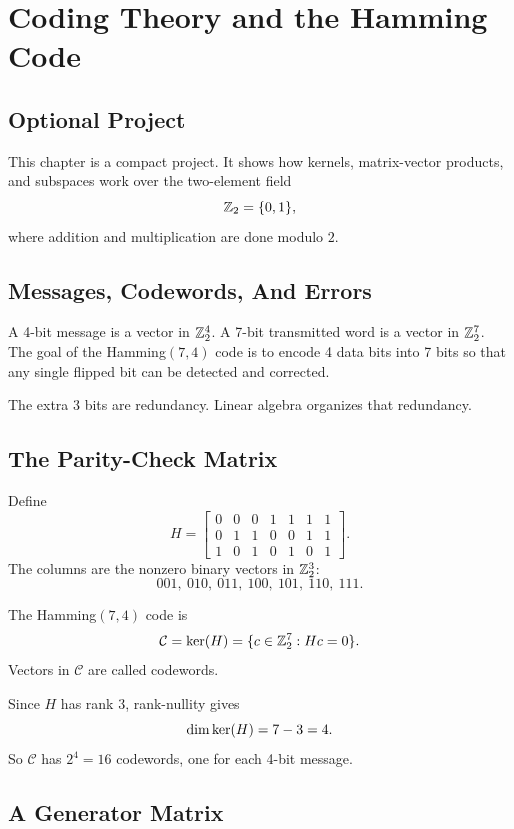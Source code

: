 \chapter{Coding Theory and the Hamming Code}
\label{ch:coding-theory-hamming}

\section{Optional Project}

This chapter is a compact project. It shows how kernels, matrix-vector
products, and subspaces work over the two-element field
\[
  \mathbb{Z}_2=\{0,1\},
\]
where addition and multiplication are done modulo $2$.

\section{Messages, Codewords, And Errors}

A 4-bit message is a vector in $\mathbb{Z}_2^4$. A 7-bit transmitted word is a vector
in $\mathbb{Z}_2^7$. The goal of the Hamming$(7,4)$ code is to encode 4 data bits into
7 bits so that any single flipped bit can be detected and corrected.

The extra 3 bits are redundancy. Linear algebra organizes that redundancy.

\section{The Parity-Check Matrix}

Define
\[
  H=
  \begin{bmatrix}
  0&0&0&1&1&1&1\\
  0&1&1&0&0&1&1\\
  1&0&1&0&1&0&1
  \end{bmatrix}.
\]
The columns are the nonzero binary vectors in $\mathbb{Z}_2^3$:
\[
  001,\ 010,\ 011,\ 100,\ 101,\ 110,\ 111.
\]

\begin{definition}[Code]
The Hamming$(7,4)$ code is
\[
  \mathcal{C}=\operatorname{ker}(H)
  =
  \{c\in\mathbb{Z}_2^7: Hc=0\}.
\]
Vectors in $\mathcal{C}$ are called codewords.
\end{definition}

Since $H$ has rank $3$, rank-nullity gives
\[
  \dim\operatorname{ker}(H)=7-3=4.
\]
So $\mathcal{C}$ has $2^4=16$ codewords, one for each 4-bit message.

\section{A Generator Matrix}

